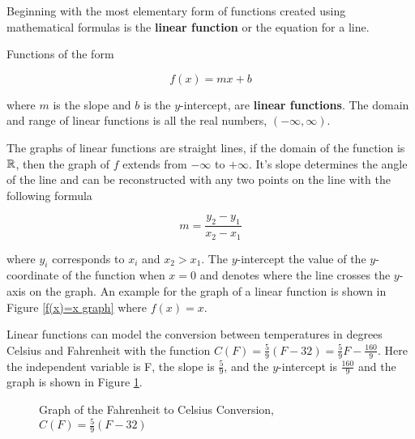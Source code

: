 Beginning with the most elementary form of functions created using mathematical formulas is the \textbf{linear function} or the equation for a line.

\begin{definition}
    Functions of the form

    \begin{equation}
        f(x) = mx + b
    \end{equation}

    \noindent where $m$ is the slope and $b$ is the $y$-intercept, are \textbf{linear functions}. The domain and range of linear functions is all the real numbers, $(-\infty,\infty)$.
\end{definition}

The graphs of linear functions are straight lines, if the domain of the function is $\mathbb{R}$, then the graph of $f$ extends from $-\infty$ to $+\infty$. It's slope determines the angle of the line and can be reconstructed with any two points on the line with the following formula

\begin{equation}
    m = \frac{y_2-y_1}{x_2-x_1}
    \label{slopeofaline}
\end{equation}

\noindent where $y_i$ corresponds to $x_i$ and $x_2 > x_1$. The $y$-intercept the value of the $y$-coordinate of the function when $x=0$ and denotes where the line crosses the $y$-axis on the graph. An example for the graph of a linear function is shown in Figure \ref{f(x)=x graph} where $f(x) = x$.

\begin{example}
    Linear functions can model the conversion between temperatures in degrees Celsius and Fahrenheit with the function $C(F) = \frac{5}{9}(F - 32) = \frac{5}{9}F - \frac{160}{9}$. Here the independent variable is F, the slope is $\frac{5}{9}$, and the $y$-intercept is $\frac{160}{9}$ and the graph is shown in Figure \ref{FtoCgraph}.

    \begin{figure}[!ht]
        \centering
        \label{FtoCgraph}
        \caption{Graph of the Fahrenheit to Celsius Conversion, $C(F) = \frac{5}{9}(F-32)$}
    \end{figure}
\end{example}

